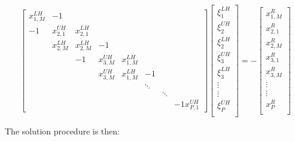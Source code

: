 \documentclass{article}
\begin{document}
    \begin{equation} \label{eqn:reduced-system}
     \begin{bmatrix}
         x_{1,M}^{LH}   &   -1                                                          \\
         -1             &   x_{2,1}^{UH} &   x_{2,1}^{LH}                               \\
                        &   x_{2,M}^{LH} &   x_{2,M}^{LH}  &  -1                        \\
         &              &   -1           &   x_{3,M}^{UH}  &  x_{1,M}^{LH}              \\
         &              &   &                x_{3,M}^{UH}  &  x_{1,M}^{LH} &    -1      \\
         &              &   &            &   &             \ddots   \\
         &              &   &            &   &             &        \ddots \\
         &  &   &   &   &   &   & -1 x_{P,1}^{UH}
      \end{bmatrix}
    \begin{bmatrix}
        \xi_1^{LH} \\
        \xi_2^{UH} \\
        \xi_2^{LH} \\
        \xi_3^{UH} \\
        \xi_3^{LH} \\
        \vdots \\
        \vdots \\
        \xi_P^{UH} \\
     \end{bmatrix}
     = -
     \begin{bmatrix}
         x_{1,M}^R \\
         x_{2,1}^R \\
         x_{2,M}^R \\
         x_{3,1}^R \\
         x_{3,M}^R \\
         \vdots \\
         \vdots \\
         x_P^R \\
      \end{bmatrix}
  \end{equation}

    The solution procedure is then:
\end{document}
